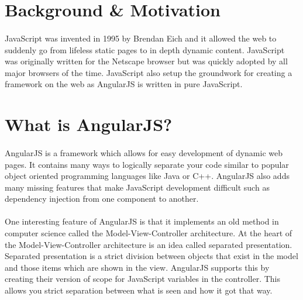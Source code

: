 \documentclass[
10pt, %
a4paper, %
oneside, %
headinclude,footinclude, %
BCOR5mm, %
]{scrartcl}
\begin{document}

{\let\thefootnote\relax{}}
\newpage %

\section{Background \& Motivation}
\paragraph{}
JavaScript was invented in 1995 by Brendan Eich and it allowed the web to suddenly go from lifeless static pages to in depth dynamic content.
JavaScript was originally written for the Netscape browser but was quickly adopted by all major browsers of the time.
JavaScript also setup the groundwork for creating a framework on the web as AngularJS is written in pure JavaScript.
 
\section{What is AngularJS?}
\paragraph{}
AngularJS is a framework which allows for easy development of dynamic web pages.
It contains many ways to logically separate your code similar to popular object oriented programming languages like Java or C++.
AngularJS also adds many missing features that make JavaScript development difficult such as dependency injection from one component to another.
\paragraph{}
One interesting feature of AngularJS is that it implements an old method in computer science called the Model-View-Controller architecture.
At the heart of the Model-View-Controller architecture is an idea called separated presentation. \cite{fowler}
Separated presentation is a strict division between objects that exist in the model and those items which are shown in the view.
AngularJS supports this by creating their version of scope for JavaScript variables in the controller.
This allows you strict separation between what is seen and how it got that way.
\end{document}
